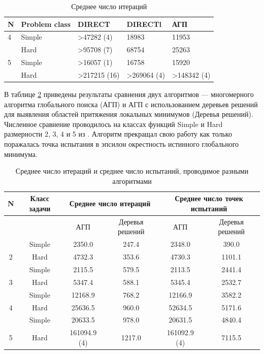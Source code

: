 \documentclass[12pt, a4paper, russian]{article}
\begin{document}
\begin{table}[!ht]
    \caption{Среднее число итераций}
    \label{tab:1}
    \centering
    \begin{tabular}{|l|l|l|l|l|}
    \hline
        N & Problem class & DIRECT & DIRECTl & АГП  \\ \hline
        4 & Simple & >47282 (4) & 18983 & 11953  \\ \hline
        ~ & Hard & >95708 (7) & 68754 & 25263  \\ \hline
        5 & Simple & >16057 (1) & 16758 & 15920  \\ \hline
        ~ & Hard & >217215 (16) & >269064 (4) & >148342 (4)  \\ \hline
    \end{tabular}
\end{table}

В таблице \ref{tab:2} приведены результаты сравнения двух алгоритмов –-- многомерного алгоритма глобального поиска (АГП) и АГП с использованием деревьев решений для выявления областей притяжения локальных минимумов (Деревья решений). Численное сравнение проводилось на классах функций Simple и Hard размерности 2, 3, 4 и 5 из \cite{fio_bib19}. Алгоритм прекращал свою работу как только поражалась точка испытания в эпсилон окрестность истинного глобального минимума. 

\begin{table}[h!]
    \caption{Среднее число итераций и среднее число испытаний, проводимое разными алгоритмами}
    \label{tab:2}
    \centering
    \begin{tabular}{|c|c|c|c|c|c|}
    \hline
	
        N & Класс задачи & \multicolumn{2}{c|}{Среднее число итераций} & \multicolumn{2}{c|}{Среднее число точек испытаний} \\ \hline
          & ~ & АГП & Деревья решений & АГП & Деревья решений \\ \hline
          & Simple & 2350.0 & 247.4 & 2348.0 & 390.0  \\ \hline
        2  & Hard & 4732.3 & 353.6 & 4730.3 & 1101.1  \\ \hline
          & Simple & 2115.5 & 579.5 & 2113.5 & 2441.4  \\ \hline
        3  & Hard & 5347.4 & 588.1 & 5345.4 & 2532.7  \\ \hline
          & Simple & 12168.9 & 768.2 & 12166.9 & 3582.2  \\ \hline
        4  & Hard & 25636.5 & 960.0 & 52634.5 & 5171.6  \\ \hline
          & Simple & 20633.5 & 978.0 & 20631.5 & 4840.4  \\ \hline
        5  & Hard & 161094.9 (4) & 1217.0 & 161092.9 (4) & 7115.5  \\ \hline
    \end{tabular}
\end{table}
\end{document}
